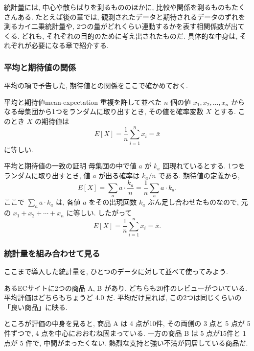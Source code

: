     統計量には, 中心や散らばりを測るもののほかに, 比較や関係を測るものもたくさんある.
    たとえば後の章では, 観測されたデータと期待されるデータのずれを測るカイ二乗統計量や, 2つの量がどれくらい連動するかを表す相関係数が出てくる.
    どれも, それぞれの目的のために考え出されたものだ.
    具体的な中身は, それぞれが必要になる章で紹介する.

    \subsubsection*{平均と期待値の関係}

    平均の項で予告した, 期待値との関係をここで確かめておく.

    \begin{prop}{平均と期待値}{mean-expectation}
      重複を許して並べた $n$ 個の値 $x_1, x_2, \ldots, x_n$ からなる母集団から1つをランダムに取り出すとき, その値を確率変数 $X$ とする.
      このとき $X$ の期待値は
      \[
        E[X] = \frac{1}{n} \sum_{i=1}^{n} x_i = \bar{x}
      \]
      に等しい.
    \end{prop}

    \begin{mybox}{平均と期待値の一致の証明}
      母集団の中で値 $a$ が $k_a$ 回現れているとする.
      1つをランダムに取り出すとき, 値 $a$ が出る確率は $k_a / n$ である.
      期待値の定義から,
      \[
        E[X] = \sum_{a} a \cdot \frac{k_a}{n} = \frac{1}{n} \sum_{a} a \cdot k_a.
      \]
      ここで $\sum_{a} a \cdot k_a$ は, 各値 $a$ をその出現回数 $k_a$ ぶん足し合わせたものなので, 元の $x_1 + x_2 + \cdots + x_n$ に等しい.
      したがって
      \[
        E[X] = \frac{1}{n} \sum_{i=1}^{n} x_i = \bar{x}.
      \]
    \end{mybox}

    \subsubsection*{統計量を組み合わせて見る}

    ここまで導入した統計量を, ひとつのデータに対して並べて使ってみよう.

    あるECサイトに2つの商品 A, B があり, どちらも20件のレビューがついている.
    平均評価はどちらもちょうど 4.0 だ.
    平均だけ見れば, この2つは同じくらいの「良い商品」に映る.

    ところが評価の中身を見ると, 商品 A は 4 点が10件, その両側の 3 点と 5 点が 5 件ずつで, 4 点を中心におおむね固まっている. 一方の商品 B は 5 点が15件と 1 点が 5 件で, 中間がまったくない.
    熱烈な支持と強い不満が同居している商品だ.

